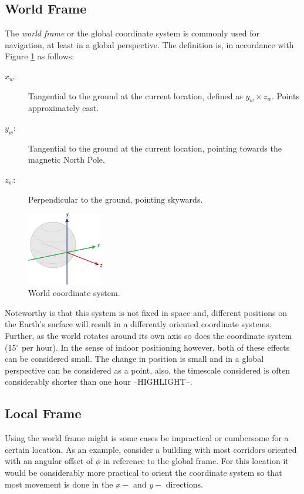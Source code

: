 \documentclass{LTHthesis}
\begin{document}
\subsection{World Frame}
%
The \emph{world frame} or the global coordinate system is commonly used for navigation, at least in a global perspective. The definition is, in accordance with Figure \ref{axis_globe} as follows:
%
\begin{description}
\item[$x_w$:] Tangential to the ground at the current location, defined as $y_w\times z_w$. Points approximately east. 
\item[$y_w$:] Tangential to the ground at the current location, pointing towards the magnetic North Pole.
\item[$z_w$:] Perpendicular to the ground, pointing skywards.
\end{description}
%
\begin{figure}[!hbt]
\begin{center}

\includegraphics[width=0.3\textwidth ]{images/background_on_navigation/axis_globe.png}
\end{center}
\caption[]{World coordinate system.\footnotemark}\label{axis_globe}
\end{figure}
%
%
Noteworthy is that this system is not fixed in space and, different positions on the Earth's surface will result in a differently oriented coordinate systems. Further, as the world rotates around its own axis so does the coordinate system (15$^\circ$ per hour). In the sense of indoor positioning however, both of these effects can be considered small. The change in position is small and in a global perspective can be considered as a point, also, the timescale considered is often considerably shorter than one hour --HIGHLIGHT--. 
%
\subsection{Local Frame}
%
Using the world frame might is some cases be impractical or cumbersome for a certain location. As an example, consider a  building with most corridors oriented with an angular offset of $\phi$ in reference to the global frame. For this location it would be considerably more practical to orient the coordinate system so that most movement is done in the $x-$ and $y-$ directions.   
\end{document}
